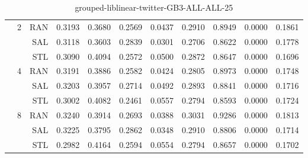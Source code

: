 \begin{center}
\begin{table}[htbp]
\begin{center}
\begin{tabular}{ | r | r | r | r | r | r | r | r | r | r | r |}
 & \multirow{3}{*}{2} & RAN & 0.3193 & 0.3680 & 0.2569 & 0.0437 & 0.2910 & 0.8949 & 0.0000 & 0.1861\\ \cline{3-11}
 &   & SAL & 0.3118 & 0.3603 & 0.2839 & 0.0301 & 0.2706 & 0.8622 & 0.0000 & 0.1778\\ \cline{3-11}
 &   & STL & 0.3090 & 0.4094 & 0.2572 & 0.0500 & 0.2872 & 0.8647 & 0.0000 & 0.1696\\ \cline{2-11}
 & \multirow{3}{*}{4} & RAN & 0.3191 & 0.3886 & 0.2582 & 0.0424 & 0.2805 & 0.8973 & 0.0000 & 0.1748\\ \cline{3-11}
 &   & SAL & 0.3203 & 0.3957 & 0.2714 & 0.0492 & 0.2893 & 0.8841 & 0.0000 & 0.1716\\ \cline{3-11}
 &   & STL & 0.3002 & 0.4082 & 0.2461 & 0.0557 & 0.2794 & 0.8593 & 0.0000 & 0.1724\\ \cline{2-11}
 & \multirow{3}{*}{8} & RAN & 0.3240 & 0.3914 & 0.2693 & 0.0388 & 0.3031 & 0.9286 & 0.0000 & 0.1813\\ \cline{3-11}
 &   & SAL & 0.3225 & 0.3795 & 0.2862 & 0.0348 & 0.2910 & 0.8806 & 0.0000 & 0.1714\\ \cline{3-11}
 &   & STL & 0.2982 & 0.4164 & 0.2594 & 0.0554 & 0.2794 & 0.8657 & 0.0000 & 0.1702\\ \cline{2-11}
\hline
\end{tabular}
\caption{grouped-liblinear-twitter-GB3-ALL-ALL-25}
\end{center}
 \end{table}
\end{center}

